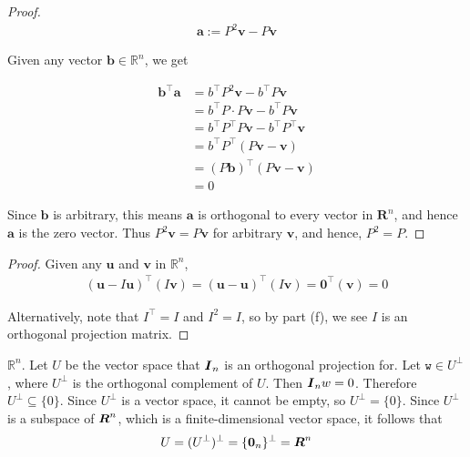 \documentclass[12pt]{article}
\begin{document}
\begin{enumerate}
\begin{proof}
	\begin{align*}
		\mathbf{a}:=P^2\mathbf{v} - P\mathbf{v}
	\end{align*}
	
	Given any vector $\mathbf{b}\in\mathbb{R}^n$, we get
	
	\begin{align*}
		\mathbf{b}^\top \mathbf{a}&=b^\top P^2\mathbf{v} - b^\top P\mathbf{v}\\
		&=b^\top P\cdot P\mathbf{v}-b^\top P\mathbf{v}\\
		&=b^\top P^\top P \mathbf{v} - b^\top P^\top \mathbf{v}
		\tag{Symmetry: $P=P^\top$}\\
		&=b^\top P^\top(P\mathbf{v}-\mathbf{v})\\
		&=(P\mathbf{b})^\top(P\mathbf{v} - \mathbf{v})\\
		&=0\tag{since $P$ is an orthogonal projection matrix}
	\end{align*}
	
	Since $\mathbf{b}$ is arbitrary, this means $\mathbf{a}$ is orthogonal to
	every vector in $\mathbf{R}^n$, and hence $\mathbf{a}$ is the zero vector.
	Thus $P^2\mathbf{v}=P\mathbf{v}$ for arbitrary $\mathbf{v}$, and hence,
	$P^2=P$.
	
\end{proof}


\begin{proof}
	Given any $\mathbf{u}$ and $\mathbf{v}$ in $\mathbb{R}^n$,
	\begin{align*}
		(\mathbf{u} -I\mathbf{u})^\top(I\mathbf{v})=(\mathbf{u}-\mathbf{u})^\top(I\mathbf{v})
		=\mathbf{0}^\top(\mathbf{v})=0
	\end{align*}
	
	Alternatively, note that $I^\top=I$ and $I^2=I$, so by part (f),
	we see $I$ is an orthogonal projection matrix.
\end{proof}



$\mathbb{R}^n$. Let $U$ be the vector space that $\boldsymbol{I}_n$ is an orthogonal projection
for. Let $\texttt{w}\in U^\perp$, where $U^\perp$ is the orthogonal complement
of $U$. Then $\boldsymbol{I}_n w=0$. Therefore $U^\perp\subseteq \{0\}$. Since $U^\perp$ is
a vector space, it cannot be empty, so $U^\perp=\{0\}$. Since $U^\perp$ is a subspace
of $\boldsymbol{R}^n$, which is a finite-dimensional vector space, it follows that
\begin{align*}
	U = (U^\perp)^\perp = \{\mathbf{0}_n\}^\perp = \boldsymbol{R}^n
\end{align*}


\end{enumerate}
\end{document}
